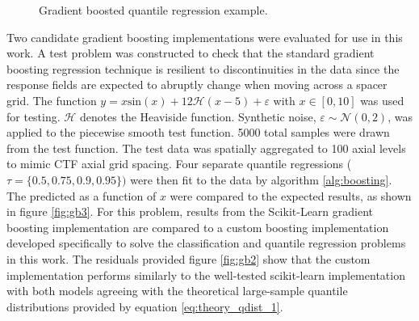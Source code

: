 

  


\begin{figure}[H]%
    \centering
    \qquad
    \qquad
    \qquad
    \qquad
    \caption[Gradient boosted quantile regression example.]{Gradient boosted quantile regression example.}%
    \label{fig:gb1}%
\end{figure}

Two candidate gradient boosting implementations were evaluated for use in this work.  A test problem was constructed to check that the standard gradient boosting regression technique is resilient to discontinuities in the data since the response fields are expected to abruptly change when moving across a spacer grid.  The function $y = x \mathrm{sin}(x) +12 \mathcal H(x-5)+\varepsilon$ with $x\in [0,10]$ was used for testing.  $\mathcal H$ denotes the Heaviside function. Synthetic noise, $\varepsilon \sim \mathcal N(0,2)$, was applied to the piecewise smooth test function.   5000 total samples were drawn from the test function. The test data was spatially aggregated to 100 axial levels to mimic CTF axial grid spacing.  Four separate quantile regressions ($\tau = \{0.5, 0.75, 0.9, 0.95 \})$ were then fit to the data by algorithm \ref{alg:boosting}. The predicted as a function of $x$ were compared to the expected results, as shown in figure \ref{fig:gb3}. For this problem, results from the Scikit-Learn gradient boosting implementation are compared to a custom boosting implementation developed specifically to solve the classification and quantile regression problems in this work.  The residuals provided figure \ref{fig:gb2} show that the custom implementation performs similarly to the well-tested scikit-learn implementation with both models agreeing with the theoretical large-sample quantile distributions provided by equation \ref{eq:theory_qdist_1}.

